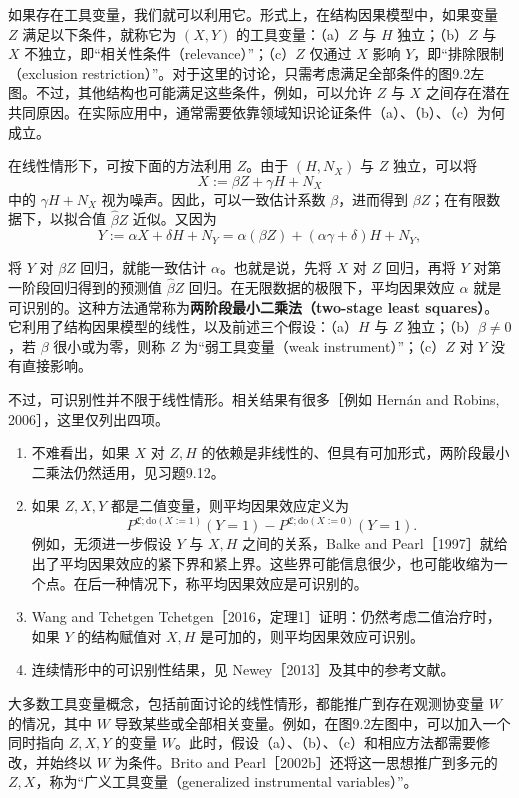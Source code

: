 如果存在工具变量，我们就可以利用它。形式上，在结构因果模型中，如果变量 $Z$ 满足以下条件，就称它为 $(X,Y)$ 的工具变量：（a）$Z$ 与 $H$ 独立；（b）$Z$ 与 $X$ 不独立，即“相关性条件（relevance）”；（c）$Z$ 仅通过 $X$ 影响 $Y$，即“排除限制（exclusion restriction）”。对于这里的讨论，只需考虑满足全部条件的图9.2左图。不过，其他结构也可能满足这些条件，例如，可以允许 $Z$ 与 $X$ 之间存在潜在共同原因。在实际应用中，通常需要依靠领域知识论证条件（a）、（b）、（c）为何成立。

在线性情形下，可按下面的方法利用 $Z$。由于 $(H,N_X)$ 与 $Z$ 独立，可以将
\[
 X:=\beta Z+\gamma H+N_X
\]
中的 $\gamma H+N_X$ 视为噪声。因此，可以一致估计系数 $\beta$，进而得到 $\beta Z$；在有限数据下，以拟合值 $\widehat\beta Z$ 近似。又因为
\[
 Y:=\alpha X+\delta H+N_Y
   =\alpha(\beta Z)+(\alpha\gamma+\delta)H+N_Y,
\]

将 $Y$ 对 $\beta Z$ 回归，就能一致估计 $\alpha$。也就是说，先将 $X$ 对 $Z$ 回归，再将 $Y$ 对第一阶段回归得到的预测值 $\widehat\beta Z$ 回归。在无限数据的极限下，平均因果效应 $\alpha$ 就是可识别的。这种方法通常称为\textbf{两阶段最小二乘法（two-stage least squares）}。它利用了结构因果模型的线性，以及前述三个假设：（a）$H$ 与 $Z$ 独立；（b）$\beta\ne0$，若 $\beta$ 很小或为零，则称 $Z$ 为“弱工具变量（weak instrument）”；（c）$Z$ 对 $Y$ 没有直接影响。



不过，可识别性并不限于线性情形。相关结果有很多［例如 Hernán and Robins, 2006］，这里仅列出四项。
\begin{enumerate}[label=(\roman*)]
 \item 不难看出，如果 $X$ 对 $Z,H$ 的依赖是非线性的、但具有可加形式，两阶段最小二乘法仍然适用，见习题9.12。
 \item 如果 $Z,X,Y$ 都是二值变量，则平均因果效应定义为
 \[
 P^{\mathfrak C;\mathrm{do}(X:=1)}(Y=1)
 -P^{\mathfrak C;\mathrm{do}(X:=0)}(Y=1).
 \]
 例如，无须进一步假设 $Y$ 与 $X,H$ 之间的关系，Balke and Pearl［1997］就给出了平均因果效应的紧下界和紧上界。这些界可能信息很少，也可能收缩为一个点。在后一种情况下，称平均因果效应是可识别的。
 \item Wang and Tchetgen Tchetgen［2016，定理1］证明：仍然考虑二值治疗时，如果 $Y$ 的结构赋值对 $X,H$ 是可加的，则平均因果效应可识别。
 \item 连续情形中的可识别性结果，见 Newey［2013］及其中的参考文献。
\end{enumerate}

大多数工具变量概念，包括前面讨论的线性情形，都能推广到存在观测协变量 $W$ 的情况，其中 $W$ 导致某些或全部相关变量。例如，在图9.2左图中，可以加入一个同时指向 $Z,X,Y$ 的变量 $W$。此时，假设（a）、（b）、（c）和相应方法都需要修改，并始终以 $W$ 为条件。Brito and Pearl［2002b］还将这一思想推广到多元的 $Z,X$，称为“广义工具变量（generalized instrumental variables）”。
